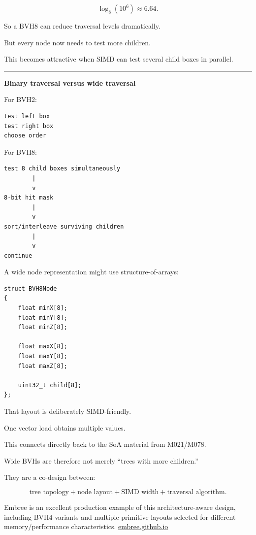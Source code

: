 \[
\log_8(10^6)\approx6.64.
\]

So a BVH8 can reduce traversal levels dramatically.

But every node now needs to test more children.

This becomes attractive when SIMD can test several child boxes in parallel.

\begin{center}\rule{0.5\linewidth}{0.5pt}\end{center}

\textbf{Binary traversal versus wide traversal}

For BVH2:

\begin{verbatim}
test left box
test right box
choose order
\end{verbatim}

For BVH8:

\begin{verbatim}
test 8 child boxes simultaneously
        |
        v
8-bit hit mask
        |
        v
sort/interleave surviving children
        |
        v
continue
\end{verbatim}

A wide node representation might use structure-of-arrays:

\begin{verbatim}
struct BVH8Node
{
    float minX[8];
    float minY[8];
    float minZ[8];

    float maxX[8];
    float maxY[8];
    float maxZ[8];

    uint32_t child[8];
};
\end{verbatim}

That layout is deliberately SIMD-friendly.

One vector load obtains multiple  values.

This connects directly back to the SoA material from M021/M078.

Wide BVHs are therefore not merely ``trees with more children.''

They are a co-design between:

\[
\boxed{
\text{tree topology}
+
\text{node layout}
+
\text{SIMD width}
+
\text{traversal algorithm}.
}
\]

Embree is an excellent production example of this architecture-aware design, including BVH4 variants and multiple primitive layouts selected for different memory/performance characteristics. \href{https://embree.github.io/papers/2014-Siggraph-Embree.pdf?utm_source=chatgpt.com}{embree.github.io}

